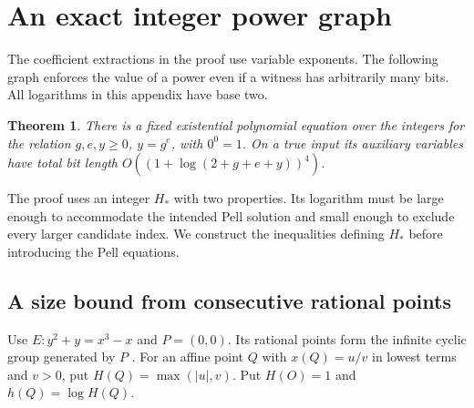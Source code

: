 \documentclass[11pt,letterpaper]{article}
\newtheorem{theorem}{Theorem}[section]
\numberwithin{equation}{section}
\begin{document}
\appendix

\section{An exact integer power graph}\label{sec:exact-power}

The coefficient extractions in the proof use variable exponents. The
following graph enforces the value of a power even if a witness has
arbitrarily many bits. All logarithms in this appendix have base two.

\begin{theorem}\label{thm:power-graph}
There is a fixed existential polynomial equation over the integers for
the relation $g,e,y\ge0$, $y=g^e$, with $0^0=1$. On a true input
its auxiliary variables have total bit length
$O((1+\log(2+g+e+y))^4)$.
\end{theorem}

The proof uses an integer $H_*$ with two properties. Its logarithm
must be large enough to accommodate the intended Pell solution and
small enough to exclude every larger candidate index. We construct
the inequalities defining $H_*$ before introducing the Pell equations.

\subsection{A size bound from consecutive rational points}

Use $E\colon y^2+y=x^3-x$ and $P=(0,0)$. Its rational points form
the infinite cyclic group generated by $P$ \cite{cremona,curve}. For an affine
point $Q$ with $x(Q)=u/v$ in lowest terms and $v>0$, put
$H(Q)=\max(|u|,v)$. Put $H(O)=1$ and $h(Q)=\log H(Q)$.
\end{document}
